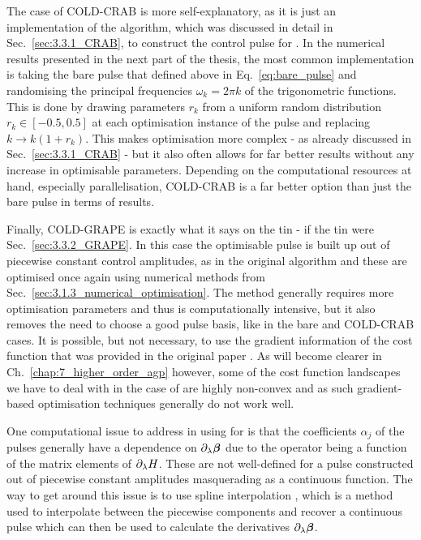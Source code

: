The case of COLD-CRAB is more self-explanatory, as it is just an implementation of the  algorithm, which was discussed in detail in Sec.~\ref{sec:3.3.1_CRAB}, to construct the control pulse for . In the numerical results presented in the next part of the thesis, the most common implementation is taking the bare pulse that defined above in Eq.~\eqref{eq:bare_pulse} and randomising the principal frequencies $\omega_k = 2 \pi k$ of the trigonometric functions. This is done by drawing parameters $r_k$ from a uniform random distribution $r_k \in [-0.5,0.5]$ at each optimisation instance of the pulse and replacing $k \rightarrow k(1+r_k)$. This makes optimisation more complex - as already discussed in Sec.~\ref{sec:3.3.1_CRAB} - but it also often allows for far better results without any increase in optimisable parameters. Depending on the computational resources at hand, especially parallelisation, COLD-CRAB is a far better option than just the bare pulse in terms of results.

Finally, COLD-GRAPE is exactly what it says on the tin - if the tin were Sec.~\ref{sec:3.3.2_GRAPE}. In this case the optimisable pulse is built up out of piecewise constant control amplitudes, as in the original  algorithm and these are optimised once again using numerical methods from Sec.~\ref{sec:3.1.3_numerical_optimisation}. The method generally requires more optimisation parameters and thus is computationally intensive, but it also removes the need to choose a good pulse basis, like in the bare and COLD-CRAB cases. It is possible, but not necessary, to use the gradient information of the cost function that was provided in the original  paper \cite{khaneja_optimal_2005}. As will become clearer in Ch.~\ref{chap:7_higher_order_agp} however, some of the cost function landscapes we have to deal with in the case of  are highly non-convex and as such gradient-based optimisation techniques generally do not work well. 

One computational issue to address in using  for  is that the coefficients $\alpha_j$ of the  pulses generally have a dependence on $\partial_{\lambda} \boldsymbol{\beta}$ due to the  operator being a function of the matrix elements of $\partial_{\lambda} H$. These are not well-defined for a pulse constructed out of piecewise constant amplitudes masquerading as a continuous function. The way to get around this issue is to use spline interpolation \cite{noauthor_spline_nodate}, which is a method used to interpolate between the piecewise components and recover a continuous pulse which can then be used to calculate the derivatives $\partial_{\lambda} \boldsymbol{\beta}$. 

